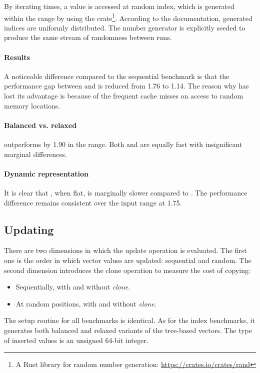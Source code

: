 By iterating \n{} times, a value is accessed at random index, which is generated within the \range{[0, N)} range by using the  crate\footnote{A Rust library for random number generation: \url{https://crates.io/crates/rand}}. According to the  documentation, generated indices are uniformly distributed. The number generator is explicitly seeded to produce the same stream of randomness between runs.

\paragraph{Results}
A noticeable difference compared to the sequential benchmark is that the performance gap between \pvec{} and \stdvec{} is reduced from 1.76 to 1.14. The reason why \stdvec{} has lost its advantage is because of the frequent cache misses on access to random memory locations.

\paragraph{Balanced vs. relaxed}
\rbvec{} outperforms \rrbvec{} by 1.90 in the \range{[100, \mega{1}]} range. Both \rrbvec{} and \imrsvec{} are equally fast with insignificant marginal differences.

\paragraph{Dynamic representation}
It is clear that \pvec{}, when flat, is marginally slower compared to \stdvec{}. The performance difference remains consistent over the input range at 1.75.

\subsection{Updating}
There are two dimensions in which the update operation is evaluated. The first one is the order in which vector values are updated: sequential and random. The second dimension introduces the clone operation to measure the cost of copying:

\begin{itemize}
    \item Sequentially, with and without \emph{clone}.
    \item At random positions, with and without \emph{clone}.
\end{itemize}

The setup routine for all benchmarks is identical. As for the index benchmarks, it generates both balanced and relaxed variants of the tree-based vectors. The type of inserted values is an unsigned 64-bit integer.

